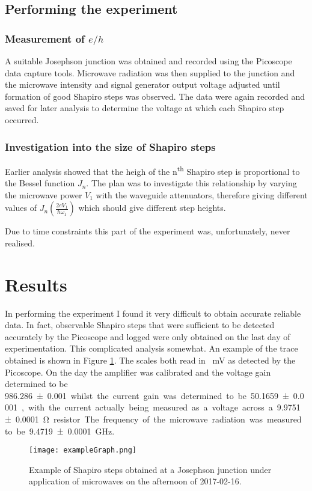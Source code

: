 \documentclass[11pt]{article}
\begin{document}
\subsection{Performing the experiment}
\subsubsection{Measurement of $e/h$}
A suitable Josephson junction was obtained and recorded using the Picoscope data capture tools. Microwave radiation was then supplied to the junction and the microwave intensity and signal generator output voltage adjusted until formation of good Shapiro steps was observed. The data were again recorded and saved for later analysis to determine the voltage at which each Shapiro step occurred.

\subsubsection{Investigation into the size of Shapiro steps}
Earlier analysis showed that the heigh of the n\textsuperscript{th} Shapiro step is proportional to the Bessel function $J_n$. The plan was to investigate this relationship by varying the microwave power $V_1$ with the waveguide attenuators, therefore giving different values of $J_n \left(\frac{2eV_1}{\hbar\omega_1}\right)$ which should give different step heights.

Due to time constraints this part of the experiment was, unfortunately, never realised.

\section{Results}
In performing the experiment I found it very difficult to obtain accurate reliable data. In fact, observable Shapiro steps that were sufficient to be detected accurately by the Picoscope and logged were only obtained on the last day of experimentation. This complicated analysis somewhat. An example of the trace obtained is shown in Figure \ref{exampleGraph}.
The scales both read in \SI{}{\milli\volt} as detected by the Picoscope. On the day the amplifier was calibrated and the voltage gain determined to be  \SI{986.286 \pm 0.001} whilst the current gain was determined to be \SI{50.1659 \pm 0.0001}, with the current actually being measured as a voltage across a \SI{9.9751 \pm 0.0001}{\ohm} resistor. The frequency of the microwave radiation was measured to be \SI{9.4719 \pm 0.0001}{\giga\hertz}.
\begin{figure}[H]
	\centering
	\texttt{[image: exampleGraph.png]}
	\caption{Example of Shapiro steps obtained at a Josephson junction under application of microwaves on the afternoon of 2017-02-16.}
	\label{exampleGraph}
\end{figure}
\end{document}
